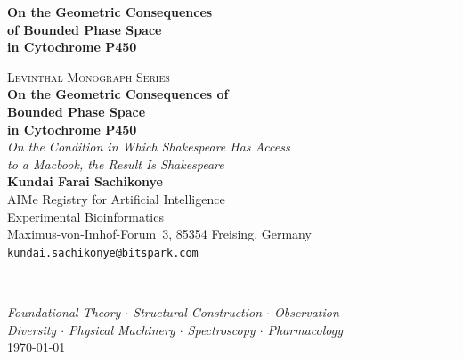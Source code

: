 \documentclass[11pt,a4paper,openany,twoside]{book}
\theoremstyle{definition}
\theoremstyle{remark}
\begin{document}

\frontmatter
\pagestyle{empty}

\begin{titlepage}
\vspace*{6cm}
\begin{center}
{\LARGE\bfseries On the Geometric Consequences\\
of Bounded Phase Space\\
in Cytochrome P450}
\end{center}
\end{titlepage}

\cleardoublepage

\begin{titlepage}
\vspace*{2cm}
\begin{center}

{\small\scshape Levinthal Monograph Series}\\[2em]

{\fontsize{22}{26}\selectfont\bfseries
On the Geometric Consequences of\\[0.4em]
Bounded Phase Space\\[0.4em]
in Cytochrome P450}\\[1.5em]

{\large\itshape
On the Condition in Which Shakespeare Has Access\\
to a Macbook, the Result Is Shakespeare}\\[3em]

{\large\bfseries Kundai Farai Sachikonye}\\[0.8em]
{\normalsize
AIMe Registry for Artificial Intelligence\\
Experimental Bioinformatics\\
Maximus-von-Imhof-Forum~3, 85354 Freising, Germany\\[0.4em]
\texttt{kundai.sachikonye@bitspark.com}}\\[3em]

\rule{0.5\textwidth}{0.4pt}\\[2em]

{\normalsize\itshape
Foundational Theory $\cdot$ Structural Construction $\cdot$ Observation\\
Diversity $\cdot$ Physical Machinery $\cdot$ Spectroscopy $\cdot$ Pharmacology}\\[2em]

{\small\today}
\end{center}
\end{titlepage}
\end{document}
